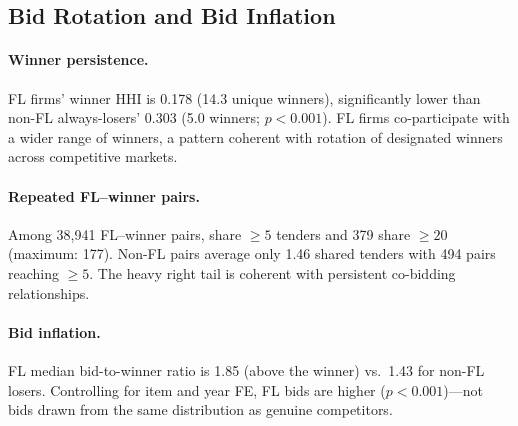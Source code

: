 
\subsection{Bid Rotation and Bid Inflation}
\label{sec:bid_rotation}

\paragraph{Winner persistence.}
FL firms' winner HHI is 0.178 (14.3 unique winners), significantly
lower than non-FL always-losers' 0.303 (5.0 winners; $p < 0.001$).
FL firms co-participate with a wider range of winners, a pattern
coherent with rotation of designated winners across competitive
markets.

\paragraph{Repeated FL--winner pairs.}
Among 38,941 FL--winner pairs, \valDyadicPairsObs share $\geq 5$ tenders and
379 share $\geq 20$ (maximum: 177). Non-FL pairs average only
1.46 shared tenders with 494 pairs reaching $\geq 5$. The heavy
right tail is coherent with persistent co-bidding relationships.

\paragraph{Bid inflation.}
FL median bid-to-winner ratio is 1.85 (\valPctEightFive above the winner) vs.\
1.43 for non-FL losers. Controlling for item and year FE, FL bids
are \valBidGapMean higher ($p < 0.001$)---not bids drawn from the same
distribution as genuine competitors.

